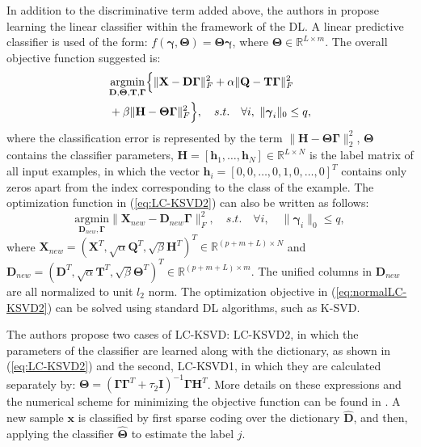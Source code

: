 \documentclass[journal]{IEEEtran}
\newcommand{\bD}{\mathbf{D}}
\newcommand{\bx}{\mathbf{x}}
\newcommand{\bh}{\mathbf{h}}
\newcommand{\bX}{\mathbf{X}}
\newcommand{\bT}{\mathbf{T}}
\newcommand{\bH}{\mathbf{H}}
\newcommand{\bQ}{\mathbf{Q}}
\newcommand{\bI}{\mathbf{I}}
\newcommand{\bGamma}{\boldsymbol{\Gamma}}
\newcommand{\bTheta}{\boldsymbol{\Theta}}
\newcommand{\bgamma}{\boldsymbol{\gamma}}
\begin{document}
In addition to the discriminative term added above, the authors in \cite{LCKSVD} propose learning the linear classifier within the framework of the DL. A linear predictive classifier is used of the form: $f(\bgamma,\bTheta)=\bTheta \bgamma$, where $\bTheta \in \mathbb{R}^{L \times m}$. The overall objective function suggested is:
\begin{equation} \label{eq:LC-KSVD2}
\begin{split}
&\underset{\bD,\bTheta,\bT,\bGamma}{\text{argmin}} \Bigl \{ \|\bX - \bD \bGamma\|_F^2 + \alpha \|\bQ-\bT \bGamma\|_F^2\\
&  + \beta \|\bH - \bTheta \bGamma\|_F^2 \Bigr \}, \quad s.t. \quad \forall i, \ \|\bgamma_i\|_0 \leq q,
\end{split}
\end{equation}
where the classification error is represented by the term $\|\bH-\bTheta \bGamma\|_2^2$, $\bTheta$ contains the classifier parameters, $\bH = [\bh_1,\ldots,\bh_N] \in \mathbb{R}^{L \times N}$ is the label matrix of all input examples, in which the vector $\bh_i = [0,0,\ldots,0,1,0,\ldots,0]^T$ contains only zeros apart from the index corresponding to the class of the example. The optimization function in (\ref{eq:LC-KSVD2}) can also be written as follows:
\begin{equation}\label{eq:normalLC-KSVD2}
\underset{\bD_{new},\bGamma}{\text{argmin}} \|\bX_{new} - \bD_{new} \bGamma\|_F^2, \quad s.t. \quad \forall i, \quad \|\bgamma_i\|_0 \leq q,
\end{equation}
where $\bX_{new}=\left(\bX^T,\sqrt{\alpha}\bQ^T,\sqrt{\beta}\bH^T\right)^T \in \mathbb{R}^{(p+m+L) \times N}$ and $\bD_{new}=\left(\bD^T,\sqrt{\alpha}\bT^T,\sqrt{\beta}\bTheta^T\right)^T \in \mathbb{R}^{(p+m+L) \times m}$. The unified columns in $\bD_{new}$ are all normalized to unit $l_2$ norm.
The optimization objective in (\ref{eq:normalLC-KSVD2}) can be solved using standard DL algorithms, such as K-SVD.

The authors propose two cases of LC-KSVD: LC-KSVD2, in which the parameters of the classifier are learned along with the dictionary, as shown in (\ref{eq:LC-KSVD2}) and the second, LC-KSVD1, in which they are calculated separately by: $\bTheta = \left(\bGamma \bGamma^T + \tau_2 \bI\right)^{-1}\bGamma \bH^T$. More details on these expressions and the numerical scheme for minimizing the objective function can be found in \cite{LCKSVD,LCKSVD2}. A new sample $\bx$ is classified by first sparse coding over the dictionary $\hat{\bD}$, and then, applying the classifier $\hat{\bTheta}$ to estimate the label $j$.
\end{document}
